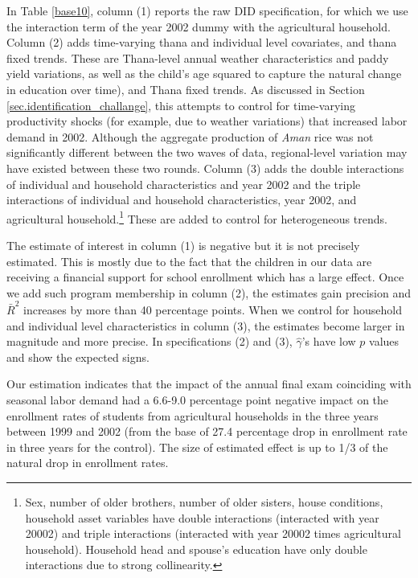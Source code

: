 \documentclass[12pt,letterpaper]{article}
\newcommand{\0}{\ensuremath{\mbox{\boldmath $0$}}}
\begin{document}
In Table \ref{base10}, column (1) reports the raw DID specification, for which we use the interaction term of the year 2002 dummy with the agricultural household. Column (2) adds time-varying thana and individual level covariates, and thana fixed trends. These are Thana-level annual weather characteristics and paddy yield variations, as well as the child's age squared to capture the natural change in education over time), and Thana fixed trends. As discussed in Section \ref{sec.identification_challange}, this attempts to control for time-varying productivity shocks (for example, due to weather variations) that increased labor demand in 2002. Although the aggregate production of \textit{Aman} rice was not significantly different between the two waves of data, regional-level variation may have existed between these two rounds. Column (3) adds the double interactions of individual and household characteristics and year 2002 and the triple interactions of individual and household characteristics, year 2002, and agricultural household.\footnote{Sex, number of older brothers, number of older sisters, house conditions, household asset variables have double interactions (interacted with year 20002) and triple interactions (interacted with year 20002 times agricultural household). Household head and spouse's education have only double interactions due to strong collinearity. } These are added to control for heterogeneous trends. 

The estimate of interest in column (1) is negative but it is not precisely estimated. This is mostly due to the fact that the children in our data are receiving a financial support for school enrollment which has a large effect. Once we add such program membership in column (2), the estimates gain precision and $\bar{R}^{2}$ increases by more than 40 percentage points. When we control for household and individual level characteristics in column (3), the estimates become larger in magnitude and more precise. In specifications (2) and (3), $\hat{\gamma}$'s have low $p$ values and show the expected signs. 

Our estimation indicates that the impact of the annual final exam coinciding with seasonal labor demand had a 6.6-9.0 percentage point negative impact on the enrollment rates of students from agricultural households in the three years between 1999 and 2002 (from the base of 27.4 percentage drop in enrollment rate in three years for the control). The size of estimated effect is up to 1/3 of the natural drop in enrollment rates. 
\end{document}
